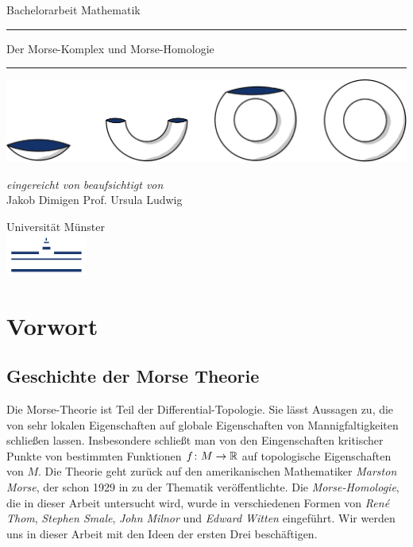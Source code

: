 \documentclass[a4paper,11pt,twoside]{scrreport}
\begin{document}
\makeheaderempty

\begin{titlepage}
    \centering
    Bachelorarbeit Mathematik \\
    \color{DarkBlue}\rule{\linewidth}{1pt}
    \color{Black}\Huge Der Morse-Komplex und Morse-Homologie \\[14pt]
    \color{DarkBlue}\rule{\linewidth}{2pt}
    \color{Black}

    \vspace{3cm}
    \includegraphics[width=\textwidth]{../resources/Me-Titlepage-Color.jpeg}

    \vfill
    \small

    \textit{eingereicht von}
    \hfill
    \textit{beaufsichtigt von} \\
    Jakob Dimigen
    \hfill
    Prof. Ursula Ludwig

    \vspace{2cm}

    Universität Münster \\
    \vspace{0.02cm}
    \includegraphics[width=0.2\textwidth]{../resources/WWU_Logo.png}
\end{titlepage}

\section*{Vorwort}

\subsection*{Geschichte der Morse Theorie}

Die Morse-Theorie ist Teil der Differential-Topologie. Sie lässt Aussagen zu, die von sehr lokalen 
Eigenschaften auf globale Eigenschaften von Mannigfaltigkeiten schließen lassen. Insbesondere schließt man
von den Eingenschaften kritischer Punkte von bestimmten Funktionen $f \colon M \to { \mathbb R }$ auf topologische 
Eigenschaften von $M$. Die Theorie geht zurück auf den amerikanischen Mathematiker \textit{Marston Morse}, 
der schon 1929 in \cite{morse} zu der Thematik veröffentlichte. Die \textit{Morse-Homologie}, die in dieser 
Arbeit untersucht wird, wurde in verschiedenen Formen von \textit{René Thom}, \textit{Stephen Smale},
\textit{John Milnor} und \textit{Edward Witten} eingeführt. Wir werden uns in dieser Arbeit mit den Ideen der 
ersten Drei beschäftigen.
\end{document}
